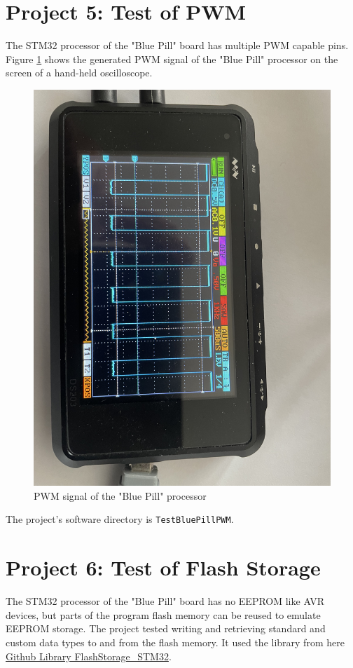 \documentclass[11pt, oneside]{scrartcl}   	%
\begin{document}
\section{Project 5: Test of PWM}
The STM32 processor of the "Blue Pill" board has multiple PWM capable pins.
Figure \ref{fig:BluePillPWM} shows the generated PWM signal of the "Blue Pill" processor on the screen of a hand-held oscilloscope.
\begin{figure}[htbp]
	\centering
	\includegraphics[width=0.9\linewidth]{Figures/Test_BluePill_PWM.jpeg}
	\caption{PWM signal of the "Blue Pill" processor}
	\label{fig:BluePillPWM}
\end{figure}

The project's software directory is \verb!TestBluePillPWM!.


\newpage
\section{Project 6: Test of Flash Storage}
The STM32 processor of the "Blue Pill" board has no EEPROM like AVR devices, but parts of the program flash memory can be reused to emulate EEPROM storage.
The project tested writing and retrieving standard and custom data types to and from the flash memory.
It used the library from here \href{https://github.com/khoih-prog/FlashStorage_STM32}{Github Library FlashStorage\_STM32}.
\end{document}
